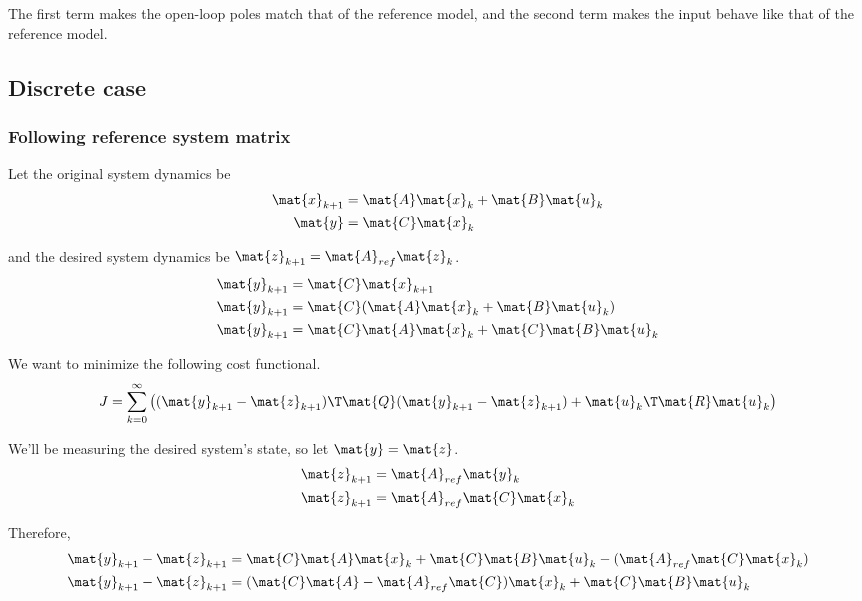 The first term makes the open-loop poles match that of the reference model, and
the second term makes the input behave like that of the reference model.

\subsection{Discrete case}

\subsubsection{Following reference system matrix}

Let the original system dynamics be
\begin{align*}
  \mat{x}_{k+1} &= \mat{A}\mat{x}_k + \mat{B}\mat{u}_k \\
  \mat{y} &= \mat{C}\mat{x}_k
\end{align*}

and the desired system dynamics be $\mat{z}_{k+1} = \mat{A}_{ref}\mat{z}_k$.
\begin{align*}
  \mat{y}_{k+1} &= \mat{C}\mat{x}_{k+1} \\
  \mat{y}_{k+1} &= \mat{C}(\mat{A}\mat{x}_k + \mat{B}\mat{u}_k) \\
  \mat{y}_{k+1} &= \mat{C}\mat{A}\mat{x}_k + \mat{C}\mat{B}\mat{u}_k
\end{align*}

We want to minimize the following cost functional.
\begin{equation*}
  J = \sum_{k=0}^\infty \left((\mat{y}_{k+1} - \mat{z}_{k+1})\T \mat{Q}
    (\mat{y}_{k+1} - \mat{z}_{k+1}) + \mat{u}_k\T\mat{R}\mat{u}_k\right)
\end{equation*}

We'll be measuring the desired system's state, so let $\mat{y} = \mat{z}$.
\begin{align*}
  \mat{z}_{k+1} &= \mat{A}_{ref}\mat{y}_k \\
  \mat{z}_{k+1} &= \mat{A}_{ref}\mat{C}\mat{x}_k
\end{align*}

Therefore,
\begin{align*}
  \mat{y}_{k+1} - \mat{z}_{k+1} &=
    \mat{C}\mat{A}\mat{x}_k + \mat{C}\mat{B}\mat{u}_k -
    (\mat{A}_{ref}\mat{C}\mat{x}_k) \\
  \mat{y}_{k+1} - \mat{z}_{k+1} &=
    (\mat{C}\mat{A} - \mat{A}_{ref}\mat{C})\mat{x}_k + \mat{C}\mat{B}\mat{u}_k
\end{align*}

